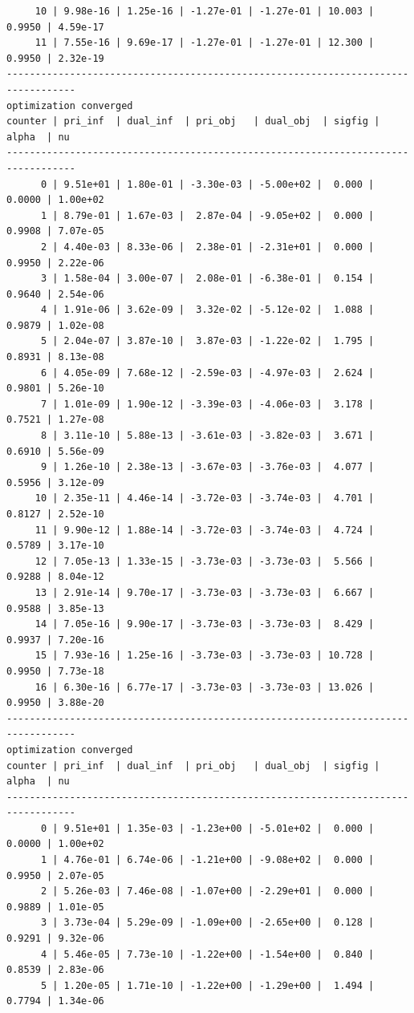 \documentclass[
]{book}
\begin{document}
\begin{verbatim}
     10 | 9.98e-16 | 1.25e-16 | -1.27e-01 | -1.27e-01 | 10.003 | 0.9950 | 4.59e-17
     11 | 7.55e-16 | 9.69e-17 | -1.27e-01 | -1.27e-01 | 12.300 | 0.9950 | 2.32e-19
----------------------------------------------------------------------------------
optimization converged
counter | pri_inf  | dual_inf  | pri_obj   | dual_obj  | sigfig | alpha  | nu 
----------------------------------------------------------------------------------
      0 | 9.51e+01 | 1.80e-01 | -3.30e-03 | -5.00e+02 |  0.000 | 0.0000 | 1.00e+02
      1 | 8.79e-01 | 1.67e-03 |  2.87e-04 | -9.05e+02 |  0.000 | 0.9908 | 7.07e-05
      2 | 4.40e-03 | 8.33e-06 |  2.38e-01 | -2.31e+01 |  0.000 | 0.9950 | 2.22e-06
      3 | 1.58e-04 | 3.00e-07 |  2.08e-01 | -6.38e-01 |  0.154 | 0.9640 | 2.54e-06
      4 | 1.91e-06 | 3.62e-09 |  3.32e-02 | -5.12e-02 |  1.088 | 0.9879 | 1.02e-08
      5 | 2.04e-07 | 3.87e-10 |  3.87e-03 | -1.22e-02 |  1.795 | 0.8931 | 8.13e-08
      6 | 4.05e-09 | 7.68e-12 | -2.59e-03 | -4.97e-03 |  2.624 | 0.9801 | 5.26e-10
      7 | 1.01e-09 | 1.90e-12 | -3.39e-03 | -4.06e-03 |  3.178 | 0.7521 | 1.27e-08
      8 | 3.11e-10 | 5.88e-13 | -3.61e-03 | -3.82e-03 |  3.671 | 0.6910 | 5.56e-09
      9 | 1.26e-10 | 2.38e-13 | -3.67e-03 | -3.76e-03 |  4.077 | 0.5956 | 3.12e-09
     10 | 2.35e-11 | 4.46e-14 | -3.72e-03 | -3.74e-03 |  4.701 | 0.8127 | 2.52e-10
     11 | 9.90e-12 | 1.88e-14 | -3.72e-03 | -3.74e-03 |  4.724 | 0.5789 | 3.17e-10
     12 | 7.05e-13 | 1.33e-15 | -3.73e-03 | -3.73e-03 |  5.566 | 0.9288 | 8.04e-12
     13 | 2.91e-14 | 9.70e-17 | -3.73e-03 | -3.73e-03 |  6.667 | 0.9588 | 3.85e-13
     14 | 7.05e-16 | 9.90e-17 | -3.73e-03 | -3.73e-03 |  8.429 | 0.9937 | 7.20e-16
     15 | 7.93e-16 | 1.25e-16 | -3.73e-03 | -3.73e-03 | 10.728 | 0.9950 | 7.73e-18
     16 | 6.30e-16 | 6.77e-17 | -3.73e-03 | -3.73e-03 | 13.026 | 0.9950 | 3.88e-20
----------------------------------------------------------------------------------
optimization converged
counter | pri_inf  | dual_inf  | pri_obj   | dual_obj  | sigfig | alpha  | nu 
----------------------------------------------------------------------------------
      0 | 9.51e+01 | 1.35e-03 | -1.23e+00 | -5.01e+02 |  0.000 | 0.0000 | 1.00e+02
      1 | 4.76e-01 | 6.74e-06 | -1.21e+00 | -9.08e+02 |  0.000 | 0.9950 | 2.07e-05
      2 | 5.26e-03 | 7.46e-08 | -1.07e+00 | -2.29e+01 |  0.000 | 0.9889 | 1.01e-05
      3 | 3.73e-04 | 5.29e-09 | -1.09e+00 | -2.65e+00 |  0.128 | 0.9291 | 9.32e-06
      4 | 5.46e-05 | 7.73e-10 | -1.22e+00 | -1.54e+00 |  0.840 | 0.8539 | 2.83e-06
      5 | 1.20e-05 | 1.71e-10 | -1.22e+00 | -1.29e+00 |  1.494 | 0.7794 | 1.34e-06

\end{verbatim}
\end{document}

